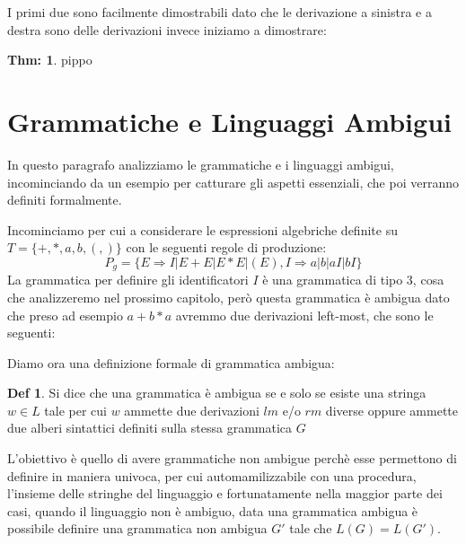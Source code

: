 \documentclass[a4paper]{report}
\theoremstyle{definition}%
\newtheorem*{defi}{Def}%
\newtheorem{thm}{Thm:}[chapter]
\begin{document}
  I primi due sono facilmente dimostrabili dato che le derivazione a sinistra e a destra sono delle derivazioni invece iniziamo a dimostrare:
  \begin{thm}

    pippo
  \end{thm}


  \section{Grammatiche e Linguaggi Ambigui}
  In questo paragrafo analizziamo le grammatiche e i linguaggi ambigui, incominciando da un esempio per catturare gli aspetti essenziali,
  che poi verranno definiti formalmente.

  Incominciamo per cui a considerare le espressioni algebriche definite su $T = \{+, *, a, b, (, )\}$ con le seguenti regole di produzione:
  \begin{equation*}
    P_g = \{E \Rightarrow I | E + E | E * E | (E), I \Rightarrow a | b | aI | bI \}
  \end{equation*}
  La grammatica per definire gli identificatori $I$ è una grammatica di tipo 3, cosa che analizzeremo nel prossimo capitolo, però
  questa grammatica è ambigua dato che preso ad esempio $a + b * a$ avremmo due derivazioni left-most, che sono le seguenti:

  Diamo ora una definizione formale di grammatica ambigua:
  \begin{defi}
    Si dice che una grammatica è ambigua se e solo se esiste una stringa $w \in L$ tale per cui $w$ ammette due derivazioni $lm$ e/o $rm$
    diverse oppure ammette due alberi sintattici definiti sulla stessa grammatica $G$
  \end{defi}
  L'obiettivo è quello di avere grammatiche non ambigue perchè esse permettono di definire in maniera univoca, per cui automamilizzabile
  con una procedura, l'insieme delle stringhe del linguaggio e fortunatamente nella maggior parte dei casi, quando il linguaggio non è ambiguo,
  data una grammatica ambigua è possibile definire una grammatica non ambigua $G'$ tale che $L(G) = L(G')$.
\end{document}
